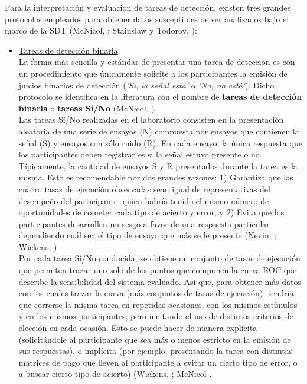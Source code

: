 Para la interpretación y evaluación de tareas de detección, existen tres grandes protocolos empleados para obtener datos susceptibles de ser analizados bajo el marco de la SDT (McNicol, \citeyear{McNicol2}; Stainslaw y Todorov, \citeyear{Stainslaw1999}):\\

\begin{itemize}
\item \underline{Tareas de detección binaria}\\

La forma más sencilla y estándar de presentar una tarea de detección es con un procedimiento que únicamente solicite a los participantes la emisión de juicios binarios de detección (\textit{'Sí, la señal está'} o \textit{'No, no está'}). Dicho protocolo se identifica en la literatura con el nombre de \textbf{tareas de detección binaria} o \textbf{tareas Sí/No} (McNicol, \citeyear{McNicol2}).\\

Las tareas Sí/No realizadas en el laboratorio consisten en la presentación aleatoria de una serie de ensayos (N) compuesta por ensayos que contienen la señal (S) y ensayos con sólo ruido (R). En cada ensayo, la única respuesta que los participantes deben registrar es si la señal estuvo presente o no.\\

Típicamente, la cantidad de ensayos S y R presentados durante la tarea es la misma. Esto es recomendable por dos grandes razones: 1) Garantiza que las cuatro tasas de ejecución observadas sean igual de representativas del desempeño del participante, quien habría tenido el mismo número de oportunidades de cometer cada tipo de acierto y error, y 2) Evita que los participantes desarrollen un sesgo a favor de una respuesta particular dependiendo cuál sea el tipo de ensayo que más se le presente (Nevin, \citeyear{Nevin1969}; Wickens, \citeyear{Wickens1}).\\

Por cada tarea Sí/No conducida, se obtiene un conjunto de tasas de ejecución que permiten trazar uno solo de los puntos que componen la curva ROC que describe la sensibilidad del sistema evaluado. Así que, para obtener más datos con los cuales trazar la curva (más conjuntos de tasas de ejecución), tendría que correrse la misma tarea en repetidas ocasiones, con los mismos estímulos y en los mismos participantes, pero incitando el uso de distintos criterios de elección en cada ocasión. Esto se puede hacer de manera explícita (solicitándole al participante que sea más o menos estricto en la emisión de sus respuestas), o implícita (por ejemplo, presentando la tarea con distintas matrices de pago que lleven al participante a evitar un cierto tipo de error, o a buscar cierto tipo de acierto) (Wickens, \citeyear{Wickens1}; McNicol \citeyear{McNicol2}.\\


\end{itemize}
